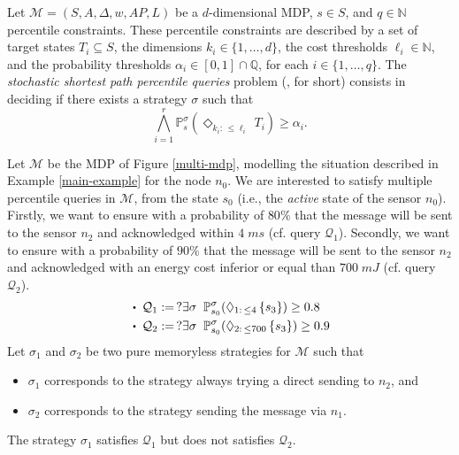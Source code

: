 \begin{definition}
  Let $\mathcal{M}=(S, A, \Delta, w, AP, L)$ be a $d$-dimensional MDP, $s \in S$, and $q \in \mathbb{N}$ percentile constraints. These percentile constraints are described by a set of target states $T_i \subseteq S$, the dimensions $k_i \in \{1, \dots, d\}$, the cost thresholds $\ell_i \in \mathbb{N}$, and the probability thresholds $\alpha_i \in [0, 1] \cap \mathbb{Q}$, for each $i \in \{1, \dots, q\}$.
  The \textit{stochastic shortest path percentile queries} problem (\SSPPQ{}, for short) consists in deciding if there exists a strategy $\sigma$ such that
  \[
    \bigwedge_{i=1}^r \mathbb{P}^\sigma_s(\Diamond_{k_i:\, \leq \ell_i}\, T_i) \geq \alpha_i.
  \]
\end{definition}

\begin{example} \label{SSPQ-example1}
  Let $\mathcal{M}$ be the MDP of Figure \ref{multi-mdp}, modelling the situation described in Example \ref{main-example} for the node $n_0$.
  We are interested to satisfy multiple percentile queries in $\mathcal{M}$, from the state $s_0$ (i.e., the \textit{active} state of the sensor $n_0$).
  Firstly, we want to ensure with a probability of $80 \%$ that the message will be sent to the sensor $n_2$ and acknowledged within $4 \; ms$ (cf. query $\mathcal{Q}_1$). Secondly, we want to ensure with a probability of $90 \%$ that the message will be sent to the sensor $n_2$ and acknowledged with an energy cost inferior or equal than $700 \; mJ$ (cf. query $\mathcal{Q}_2$).
  \begin{align*}
    &\bigcdot\;\mathcal{Q}_1 := \,  ?\exists \sigma \;\; \mathbb{P}^{\sigma}_{s_0}(\Diamond_{1: \, \leq 4} \, \{s_3\}) \geq 0.8 \\
    &\bigcdot\;\mathcal{Q}_2 := \, ? \exists \sigma \;\; \mathbb{P}_{s_0}^{\sigma}(\Diamond_{2: \, \leq 700} \, \{s_3\}) \geq 0.9
  \end{align*}
  Let $\sigma_1$ and $\sigma_2$ be two pure memoryless strategies for $\mathcal{M}$ such that
  \begin{itemize}
    \item $\sigma_1$ corresponds to the strategy always trying a direct sending to $n_2$, and
    \item $\sigma_2$ corresponds to the strategy sending the message via $n_1$.
  \end{itemize}
  The strategy $\sigma_1$ satisfies $\mathcal{Q}_1$ but does not satisfies $\mathcal{Q}_2$.

\end{example}
